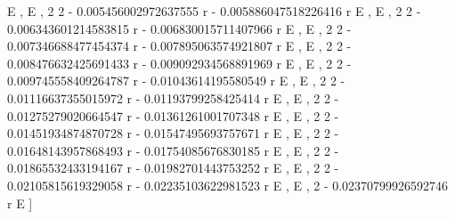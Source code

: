 \documentclass[a4paper,10pt]{article}
\begin{document}
\begin{eulernotebook}
\begin{eulercomment}
\begin{eulercomment}
\begin{eulercomment}
\begin{eulercomment}
\begin{eulercomment}
\begin{eulercomment}
\begin{eulercomment}
\begin{eulercomment}
\begin{eulercomment}
\begin{eulercomment}
\begin{eulercomment}
\begin{eulercomment}
\begin{eulercomment}
\begin{eulercomment}
\begin{eulercomment}
\begin{eulercomment}
\begin{eulercomment}
\begin{eulercomment}
\begin{eulercomment}
\begin{eulercomment}
\begin{eulercomment}
\begin{eulercomment}
\begin{eulercomment}
\begin{eulercomment}
\begin{eulercomment}
\begin{eulercomment}
\begin{eulercomment}
\begin{eulercomment}
\begin{euleroutput}
  E                         , E                         , 
                           2                           2
   - 0.005456002972637555 r    - 0.005886047518226416 r
  E                         , E                         , 
                           2                           2
   - 0.006343601214583815 r    - 0.006830015711407966 r
  E                         , E                         , 
                           2                           2
   - 0.007346688477454374 r    - 0.007895063574921807 r
  E                         , E                         , 
                           2                           2
   - 0.008476632425691433 r    - 0.009092934568891969 r
  E                         , E                         , 
                           2                          2
   - 0.009745558409264787 r    - 0.01043614195580549 r
  E                         , E                        , 
                          2                          2
   - 0.01116637355015972 r    - 0.01193799258425414 r
  E                        , E                        , 
                          2                          2
   - 0.01275279020664547 r    - 0.01361261001707348 r
  E                        , E                        , 
                          2                          2
   - 0.01451934874870728 r    - 0.01547495693757671 r
  E                        , E                        , 
                          2                          2
   - 0.01648143957868493 r    - 0.01754085676830185 r
  E                        , E                        , 
                          2                          2
   - 0.01865532433194167 r    - 0.01982701443753252 r
  E                        , E                        , 
                          2                          2
   - 0.02105815619329058 r    - 0.02235103622981523 r
  E                        , E                        , 
                          2
   - 0.02370799926592746 r
  E                        ]
  

\end{euleroutput}
\end{eulercomment}
\end{eulercomment}
\end{eulercomment}
\end{eulercomment}
\end{eulercomment}
\end{eulercomment}
\end{eulercomment}
\end{eulercomment}
\end{eulercomment}
\end{eulercomment}
\end{eulercomment}
\end{eulercomment}
\end{eulercomment}
\end{eulercomment}
\end{eulercomment}
\end{eulercomment}
\end{eulercomment}
\end{eulercomment}
\end{eulercomment}
\end{eulercomment}
\end{eulercomment}
\end{eulercomment}
\end{eulercomment}
\end{eulercomment}
\end{eulercomment}
\end{eulercomment}
\end{eulercomment}
\end{eulercomment}
\end{eulernotebook}
\end{document}
